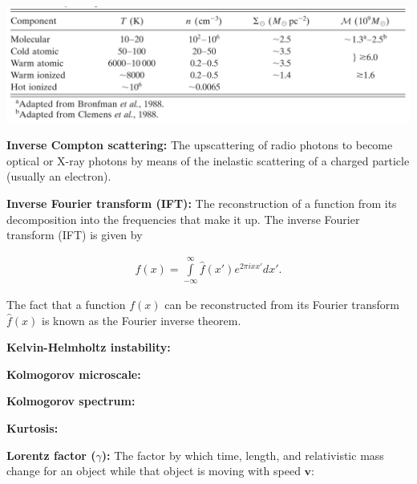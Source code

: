 \documentclass[a4paper,11pt]{article}
\begin{document}
\begin{table}[h]
\begin{center}
 \label{table:ismphases}
\includegraphics[width=15cm]{figures/ISMphases.png}
\end{center}
\end{table}

{\noindent}\textbf{Inverse Compton scattering:} The upscattering of radio photons to become optical or X-ray photons by means of the inelastic scattering of a charged particle (usually an electron).

{\noindent}\textbf{Inverse Fourier transform (IFT):} The reconstruction of a function from its decomposition into the frequencies that make it up. The inverse Fourier transform (IFT) is given by

\begin{align*}
    f(x) = \int\limits_{-\infty}^\infty \hat{f}(x')e^{2\pi ixx'}dx'.
\end{align*}

{\noindent}The fact that a function $f(x)$ can be reconstructed from its Fourier transform $\hat{f}(x)$ is known as the Fourier inverse theorem.

{\noindent}\textbf{Kelvin-Helmholtz instability:}

{\noindent}\textbf{Kolmogorov microscale:}

{\noindent}\textbf{Kolmogorov spectrum:}


{\noindent}\textbf{Kurtosis:}

{\noindent}\textbf{Lorentz factor ($\gamma$):} The factor by which time, length, and relativistic mass change for an object while that object is moving with speed $\mathbf{v}$:
\end{document}
